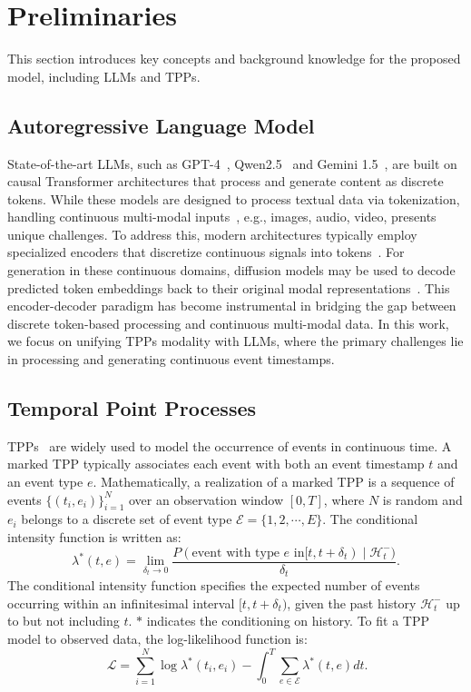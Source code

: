 
\section{Preliminaries}

This section introduces key concepts and background knowledge for the proposed model, including LLMs and TPPs.
\subsection{Autoregressive Language Model}
State-of-the-art LLMs, such as GPT-4~\citep{achiam2023gpt}, Qwen2.5~\citep{yang2024qwen25} and Gemini 1.5~\citep{team2024gemini}, are built on causal Transformer architectures that process and generate content as discrete tokens. While these models are designed to process textual data via tokenization, handling continuous multi-modal inputs~\citep{hurst2024gpt,yao2024minicpm,fu2025vita}, e.g., images, audio, video, presents unique challenges. To address this, modern architectures typically employ specialized encoders that discretize continuous signals into tokens~\citep{liu2024visual,wang2024qwen2}. For generation in these continuous domains, diffusion models may be used to decode predicted token embeddings back to their original modal representations~\citep{bao2023one,tang2024any}. This encoder-decoder paradigm has become instrumental in bridging the gap between discrete token-based processing and continuous multi-modal data. In this work, we focus on unifying TPPs modality with LLMs, where the primary challenges lie in processing and generating continuous event timestamps. 


\subsection{Temporal Point Processes}
TPPs~\citep{Daley2008} are widely used to model the occurrence of events in continuous time. A marked TPP typically associates each event with both an event timestamp $t$ and an event type $e$. 
Mathematically, a realization of a marked TPP is a sequence of events $\{(t_i,e_i)\}_{i=1}^N$ over an observation window $[0,T]$, where $N$ is random and $e_i$ belongs to a discrete set of event type $\mathcal{E}=\{1,2,\cdots,E\}$. The conditional intensity function is written as: 
\begin{equation*}
    \lambda^*(t,e) = \underset{\delta_t \rightarrow 0}{\lim}\frac{P(\text{event with type $e$ in}[t,t+\delta_t)\mid \mathcal{H}_{t}^-)}{\delta_t}.
\end{equation*}
The conditional intensity function specifies the expected number of events occurring within an infinitesimal interval $[t,t+\delta_t)$, given the past history $\mathcal{H}_{t}^-$ up to but not including $t$. 
$*$ indicates the conditioning on history. 
To fit a TPP model to observed data, the log-likelihood function is: 
\begin{equation}~\label{eq:loglikelihood}
    \mathcal{L} = \sum^N_{i=1}\log \lambda^*(t_i,e_i)-\int^T_0 \sum_{e\in \mathcal{E}} \lambda^*(t, e)dt. 
\end{equation}

